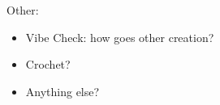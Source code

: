 
		\item Other:
		\begin{itemize}
			\item Vibe Check: how goes other creation?

			\item Crochet?

			\item Anything else?

		\end{itemize}
